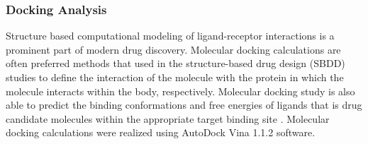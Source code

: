\frametitle{Docking Analysis}
Structure based computational modeling of ligand-receptor interactions is a prominent part of modern drug discovery. Molecular docking calculations are often preferred methods that used in the structure-based drug design (SBDD) studies to define the interaction of the molecule with the protein in which the molecule interacts within the body, respectively. Molecular docking study is also able to predict the binding conformations and free energies of ligands that is drug candidate molecules within the appropriate target binding site \cite{ferreira2015molecular}. Molecular docking calculations were realized using AutoDock Vina 1.1.2 \cite{trott2010autodock} software.